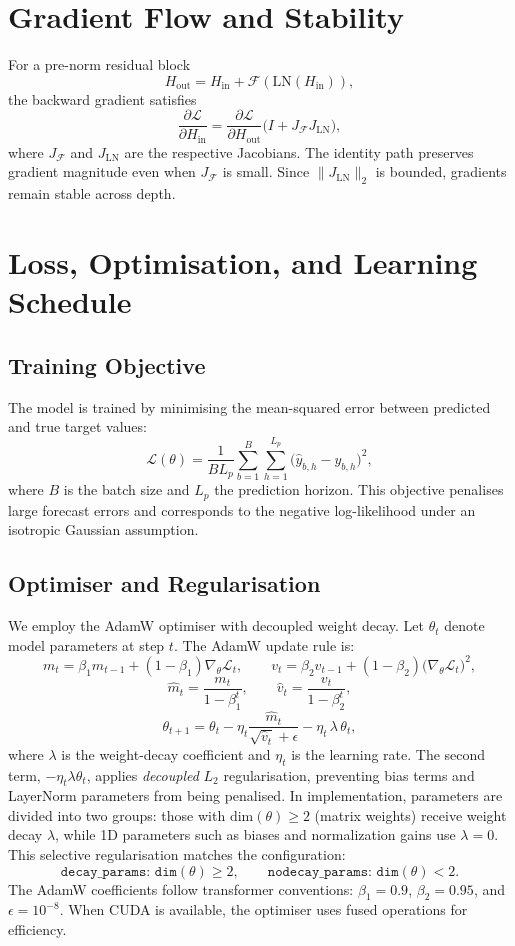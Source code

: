 \documentclass[11pt]{article}
\begin{document}
\section{Gradient Flow and Stability}

For a pre-norm residual block
\[
H_{\text{out}} = H_{\text{in}} + \mathcal{F}(\mathrm{LN}(H_{\text{in}})),
\]
the backward gradient satisfies
\[
\frac{\partial \mathcal{L}}{\partial H_{\text{in}}}
= \frac{\partial \mathcal{L}}{\partial H_{\text{out}}}
\Big(I + J_{\mathcal{F}}J_{\mathrm{LN}}\Big),
\]
where $J_{\mathcal{F}}$ and $J_{\mathrm{LN}}$ are the respective Jacobians.
The identity path preserves gradient magnitude even when
$J_{\mathcal{F}}$ is small. Since $\|J_{\mathrm{LN}}\|_2$ is bounded,
gradients remain stable across depth.


\section{Loss, Optimisation, and Learning Schedule}

\subsection{Training Objective}

The model is trained by minimising the mean-squared error between predicted and
true target values:
\[
\mathcal{L}(\theta)
= \frac{1}{B L_p}\sum_{b=1}^B\sum_{h=1}^{L_p}
\big(\hat{y}_{b,h}-y_{b,h}\big)^2,
\]
where $B$ is the batch size and $L_p$ the prediction horizon.
This objective penalises large forecast errors and corresponds to the
negative log-likelihood under an isotropic Gaussian assumption.

\subsection{Optimiser and Regularisation}

We employ the AdamW optimiser with decoupled weight decay.
Let $\theta_t$ denote model parameters at step $t$.
The AdamW update rule is:
\[
m_t = \beta_1 m_{t-1} + (1-\beta_1)\nabla_\theta \mathcal{L}_t, \qquad
v_t = \beta_2 v_{t-1} + (1-\beta_2)\big(\nabla_\theta \mathcal{L}_t\big)^2,
\]
\[
\hat{m}_t = \frac{m_t}{1-\beta_1^t}, \qquad
\hat{v}_t = \frac{v_t}{1-\beta_2^t},
\]
\[
\theta_{t+1} = \theta_t
- \eta_t \frac{\hat{m}_t}{\sqrt{\hat{v}_t} + \epsilon}
- \eta_t\,\lambda\,\theta_t,
\]
where $\lambda$ is the weight-decay coefficient and $\eta_t$ is the learning rate.
The second term, $-\eta_t\lambda\theta_t$, applies \emph{decoupled}
$L_2$ regularisation, preventing bias terms and LayerNorm parameters from
being penalised.
In implementation, parameters are divided into two groups:
those with $\mathrm{dim}(\theta) \ge 2$ (matrix weights) receive weight decay $\lambda$,
while 1D parameters such as biases and normalization gains use $\lambda=0$.
This selective regularisation matches the configuration:
\[
\texttt{decay\_params: dim}(\theta)\ge2,\qquad
\texttt{nodecay\_params: dim}(\theta)<2.
\]
The AdamW coefficients follow transformer conventions:
$\beta_1=0.9$, $\beta_2=0.95$, and $\epsilon=10^{-8}$.
When CUDA is available, the optimiser uses fused operations for efficiency.
\end{document}

